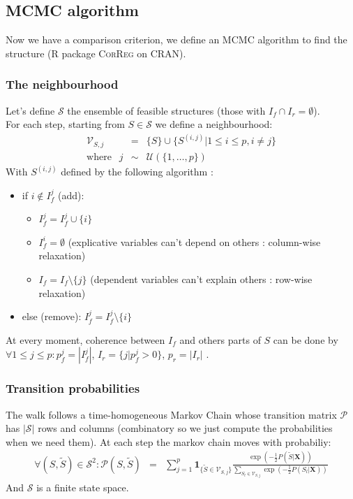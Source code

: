 \documentclass[11pt,a4paper]{article}
\begin{document}

\subsection{MCMC algorithm}
	Now we have a comparison criterion, we define an MCMC algorithm to find the structure (R package \textsc{CorReg} on CRAN). 
	\subsubsection{The neighbourhood}
	Let's define $\mathcal{S}$ the ensemble of feasible structures (those with $I_f\cap I_r=\emptyset$).
	\\
	For each step, starting from $S \in \mathcal{S}$ we define a neighbourhood:
		\begin{eqnarray}
		\mathcal{V}_{S,j}&=& \{S \}\cup \{ S^{(i,j)} |1\leq i \leq p, i\neq j  \} \\
		\textrm{where }\ \ j &\sim & \mathcal{U}(\{1,\dots,p\}) 
	\end{eqnarray}	
	With $S^{(i,j)}$ defined by the following algorithm :
	\begin{itemize}
		\item if $i \notin I_f^j$ (add): 
			\begin{itemize}
				\item $I_f^j=I_f^j\cup \{i\}$
				\item $I_f^i=\emptyset$ (explicative variables can't depend on others : column-wise relaxation)
				\item $I_f=I_f \setminus \{j\}$ (dependent variables can't explain others : row-wise relaxation) 
			\end{itemize}			 
		\item else (remove): $I_f^j=I_f^j\setminus \{i\}$
	\end{itemize}
	
	\smallskip
	At every moment, coherence between $I_f$ and others parts of $S$ can be done by $\forall 1\leq j\leq p :  p_f^j=|I_f^j|$, $I_r=\{j |p_f^j>0 \}$, $p_r= |I_r|$ .
		
	\subsubsection{Transition probabilities}
	
	The walk follows a time-homogeneous Markov Chain whose transition matrix $\mathcal{P}$ has $|\mathcal{S}|$ rows and columns (combinatory so we just compute the probabilities when we need them).
	At each step the markov chain moves with probabiliy:
	\begin{eqnarray}
			\forall (S,\tilde{S}) \in \mathcal{S}^2 : \mathcal{P}(S,\tilde{S})&=&\sum_{j=1}^p \mathbf{1}_{ \{\tilde{S}\in \mathcal{V}_{S,j}\} }\frac{\exp(-\frac{1}{2}P(\tilde{S}|\boldsymbol{X}))}{\sum_{S_l\in \mathcal{V}_{S,j}}\exp(-\frac{1}{2}P(S_l|\boldsymbol{X}))} 
	\end{eqnarray}
	And $\mathcal{S}$ is a finite state space.%
	 
\end{document}

